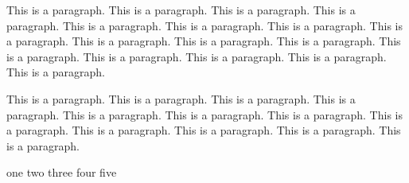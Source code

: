 \documentclass{article}
\begin{document}
This is a paragraph. This is a paragraph. This is a paragraph. This is a paragraph. 
This is a paragraph. This is a paragraph. This is a paragraph. This is a paragraph. 
This is a paragraph. This is a paragraph. This is a paragraph. This is a paragraph. 
This is a paragraph. This is a paragraph. This is a paragraph. This is a paragraph. 

This is a paragraph. This is a paragraph. This is a paragraph. This is a paragraph. 
This is a paragraph. This is a paragraph. This is a paragraph. This is a paragraph. 
This is a paragraph. This is a paragraph. This is a paragraph. This is a paragraph. 

\begin{algorithm}[H]
    one \;%
    two \;%
    three \;%
    four \;%
    five \;%
\end{algorithm}
\end{document}
